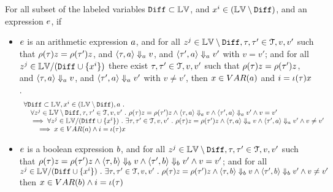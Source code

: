 \begin{lem}
	\label{lem:inv_expr_gnl}
	For all subset of the labeled variables $\mathtt{Diff} \subset \mathbb{LV}$, and $x^i \in (\mathbb{LV} \setminus \mathtt{Diff})$,
	and an expression $e$, if 
	\begin{itemize}
		\item $e$ is an arithmetic expression $a$,
		and for all $z^j \in \mathbb{LV} \setminus \mathtt{Diff}, \mathtt{\tau}, \mathtt{\tau}' \in \mathcal{T}, v, v'$ such that 
		$\rho(\mathtt{\tau}) z = \rho(\mathtt{\tau}') z$, and 
		$
		\langle \mathtt{\tau}, a \rangle \Downarrow_a v$, and $\langle \mathtt{\tau}', a \rangle \Downarrow_a v'$ with $v = v'$;
		and for all $z^j \in \mathbb{LV} / (\mathtt{Diff} \cup \{x^i\} )$ 
		there exist $\mathtt{\tau}, \mathtt{\tau}' \in \mathcal{T}, v, v'$ such that 
		$\rho(\mathtt{\tau}) z = \rho(\mathtt{\tau}') z$, and 
		$
		\langle \mathtt{\tau}, a \rangle \Downarrow_a v$, and $\langle \mathtt{\tau}', a \rangle \Downarrow_a v'$ with $v \neq v'$,
		then $x \in VAR(a)$ and $i = \iota(\mathtt{\tau}) x$.
		\[
			\begin{array}{l}
			\forall \mathtt{Diff} \subset \mathbb{LV},  x^i \in (\mathbb{LV} \setminus \mathtt{Diff}), a ~.~
			\\ \quad
			\forall z^j \in \mathbb{LV} \setminus \mathtt{Diff}, \mathtt{\tau}, \mathtt{\tau}' \in \mathcal{T}, v, v' ~.~ 
			\rho(\mathtt{\tau}) z = \rho(\mathtt{\tau}') z \land 
			\langle \mathtt{\tau}, a \rangle \Downarrow_a v \land \langle \mathtt{\tau}', a \rangle \Downarrow_a v' \land v = v'
			\\ \quad
			\implies 
			\forall z^j \in \mathbb{LV} / (\mathtt{Diff} \cup \{x^i\} ) ~.~ 
			\exists \mathtt{\tau}, \mathtt{\tau}' \in \mathcal{T}, v, v'~.~ 
			\rho(\mathtt{\tau}) z = \rho(\mathtt{\tau}') z \land 
			\langle \mathtt{\tau}, a \rangle \Downarrow_a v \land \langle \mathtt{\tau}', a \rangle \Downarrow_a v' \land v \neq v'
			\\ \qquad
			\implies x \in VAR(a) \land i = \iota(\mathtt{\tau}) x
			\end{array}
		\]
	\item $e$ is a boolean expression $b$,
	and for all $ z^j \in \mathbb{LV} \setminus \mathtt{Diff}, \mathtt{\tau}, \mathtt{\tau}' \in \mathcal{T}, v, v'$ such that 
	$ \rho(\mathtt{\tau}) z = \rho(\mathtt{\tau}') z \land 
	\langle \mathtt{\tau}, b \rangle \Downarrow_b v \land \langle \mathtt{\tau}', b \rangle \Downarrow_b v' \land v = v'$;
	and for all
	$ z^j \in \mathbb{LV} / (\mathtt{Diff} \cup \{x^i\} ) ~.~ 
	 \exists \mathtt{\tau}, \mathtt{\tau}' \in \mathcal{T}, v, v'~.~ 
	\rho(\mathtt{\tau}) z = \rho(\mathtt{\tau}') z \land 
	\langle \mathtt{\tau}, b \rangle \Downarrow_b v \land \langle \mathtt{\tau}', b \rangle \Downarrow_b v' \land v \neq v'$
	then 
	 $x \in VAR(b) \land i = \iota(\mathtt{\tau})$
	\[
		\begin{array}{l}

\end{array}\]
\end{itemize}
\end{lem}

